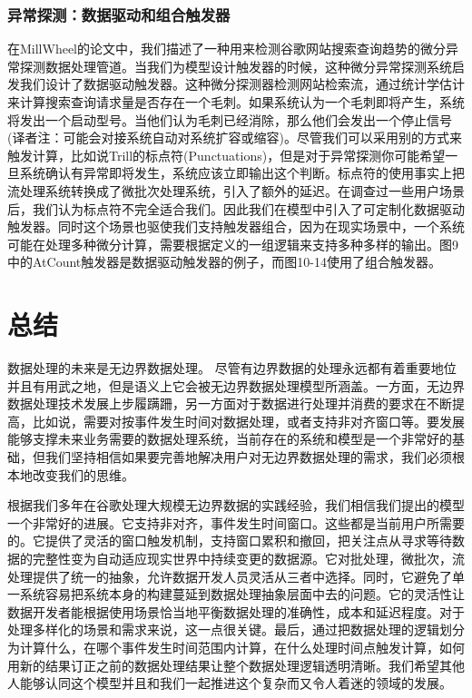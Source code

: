 \documentclass[oneside]{ctexbook}
\begin{document}
\subsubsection{异常探测：数据驱动和组合触发器}

在MillWheel的论文中，我们描述了一种用来检测谷歌网站搜索查询趋势的微分异常探测数据处理管道。当我们为模型设计触发器的时候，这种微分异常探测系统启发我们设计了数据驱动触发器。这种微分探测器检测网站检索流，通过统计学估计来计算搜索查询请求量是否存在一个毛刺。如果系统认为一个毛刺即将产生，系统将发出一个启动型号。当他们认为毛刺已经消除，那么他们会发出一个停止信号(译者注：可能会对接系统自动对系统扩容或缩容)。尽管我们可以采用别的方式来触发计算，比如说Trill的标点符(Punctuations)，但是对于异常探测你可能希望一旦系统确认有异常即将发生，系统应该立即输出这个判断。标点符的使用事实上把流处理系统转换成了微批次处理系统，引入了额外的延迟。在调查过一些用户场景后，我们认为标点符不完全适合我们。因此我们在模型中引入了可定制化数据驱动触发器。同时这个场景也驱使我们支持触发器组合，因为在现实场景中，一个系统可能在处理多种微分计算，需要根据定义的一组逻辑来支持多种多样的输出。图9中的AtCount触发器是数据驱动触发器的例子，而图10-14使用了组合触发器。

\section{总结}

数据处理的未来是无边界数据处理。 尽管有边界数据的处理永远都有着重要地位并且有用武之地，但是语义上它会被无边界数据处理模型所涵盖。一方面，无边界数据处理技术发展上步履蹒跚，另一方面对于数据进行处理并消费的要求在不断提高，比如说，需要对按事件发生时间对数据处理，或者支持非对齐窗口等。要发展能够支撑未来业务需要的数据处理系统，当前存在的系统和模型是一个非常好的基础，但我们坚持相信如果要完善地解决用户对无边界数据处理的需求，我们必须根本地改变我们的思维。

根据我们多年在谷歌处理大规模无边界数据的实践经验，我们相信我们提出的模型一个非常好的进展。它支持非对齐，事件发生时间窗口。这些都是当前用户所需要的。它提供了灵活的窗口触发机制，支持窗口累积和撤回，把关注点从寻求等待数据的完整性变为自动适应现实世界中持续变更的数据源。它对批处理，微批次，流处理提供了统一的抽象，允许数据开发人员灵活从三者中选择。同时，它避免了单一系统容易把系统本身的构建蔓延到数据处理抽象层面中去的问题。它的灵活性让数据开发者能根据使用场景恰当地平衡数据处理的准确性，成本和延迟程度。对于处理多样化的场景和需求来说，这一点很关键。最后，通过把数据处理的逻辑划分为计算什么，在哪个事件发生时间范围内计算，在什么处理时间点触发计算，如何用新的结果订正之前的数据处理结果让整个数据处理逻辑透明清晰。我们希望其他人能够认同这个模型并且和我们一起推进这个复杂而又令人着迷的领域的发展。
\end{document}
